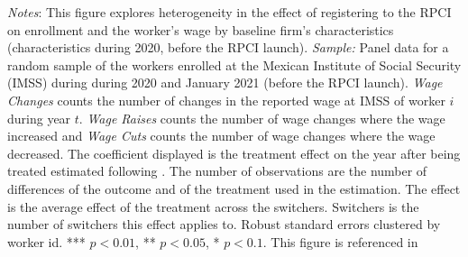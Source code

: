 \documentclass[oneside,11pt]{article}
\begin{document}
\scriptsize{
\noindent \textit{Notes}: This figure explores heterogeneity in the effect of registering to the RPCI on enrollment and the worker's wage by baseline firm's characteristics (characteristics during 2020, before the RPCI launch). \textit{Sample:} Panel data for a random sample of the workers enrolled at the Mexican Institute of Social Security (IMSS) during during 2020 and January 2021 (before the RPCI launch). \textit{Wage Changes} counts the number of changes in the reported wage at IMSS of worker $i$ during year $t$. \textit{Wage Raises} counts the number of wage changes where the wage increased and \textit{Wage Cuts} counts the number of wage changes where the wage decreased. The coefficient displayed is the treatment effect on the year after being treated estimated following \cite{de2020two}. The number of observations are the number of differences of the outcome and of the treatment used in the estimation. The effect is the average effect of the treatment across the switchers. Switchers is the number of switchers this effect applies to. Robust standard errors clustered by worker id. *** $p<0.01$, ** $p<0.05$, * $p<0.1$. This figure is referenced in %
}

\clearpage


\newpage

\end{document}
